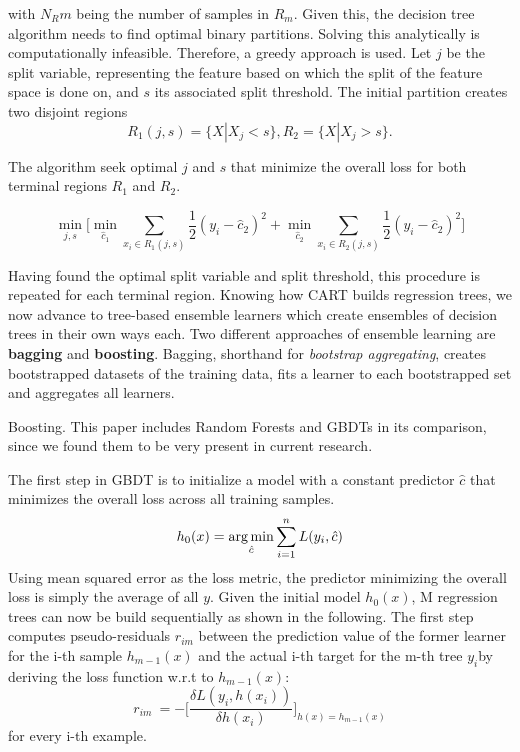 with $ N_Rm $ being the number of samples in $ R_m $. Given this, the decision tree algorithm needs to find optimal binary partitions. Solving this analytically is computationally infeasible. Therefore, a greedy approach is used.
Let $ j $ be the split variable, representing the feature based on which the split of the feature space is done on, and $ s $ its associated split threshold.
The initial partition creates two disjoint regions
\begin{equation}
	R_1 (j,s) = \{X | X_j < s \}, R_{2} = \{X | X_j > s\}.
\end{equation}

The algorithm seek optimal $ j $ and $ s $ that minimize the overall loss for both terminal regions $ R_1 $ and $ R_2 $.

\begin{equation}\label{minjs}
	\min_{j,s} \bigg [\min_{\hat{c}_1} \sum_{x_i \in R_1(j,s)} \dfrac{1}{2}(y_i - \hat{c}_{2})^2 + \min_{\hat{c}_2} \sum_{x_i \in R_{2}(j,s)} \dfrac{1}{2}(y_i - \hat{c}_{2})^2\bigg]
\end{equation}

Having found the optimal split variable and split threshold, this procedure is repeated for each terminal region.
Knowing how CART builds regression trees, we now advance to tree-based ensemble learners which create ensembles of decision trees in their own ways each.
Two different approaches of ensemble learning are \textbf{bagging} and \textbf{boosting}. Bagging, shorthand for \textit{bootstrap aggregating}, creates bootstrapped datasets of the training data, fits a learner to each bootstrapped set and aggregates all learners.


Boosting. 
This paper includes Random Forests and GBDTs in its comparison, since we found them to be very present in current research.  



The first step in GBDT is to initialize a model with a constant predictor $ \hat{c} $ that minimizes the overall loss across all training samples.
\begin{equation}
h_{0}(x) =  \operatorname*{arg\,min}_{\hat{c}} \sum_{i=1}^n L(y_i,\hat{c}) \label{gbdt_step1}
\end{equation}
Using mean squared error as the loss metric, the predictor minimizing the overall loss is simply the average of all $ y $.
Given the initial model $ h_0(x) $, M regression trees can now be build sequentially as shown in the following. 
The first step computes pseudo-residuals $ r_{im} $ between the prediction value of the former learner for the i-th sample $ h_{m-1}(x) $ and the actual i-th target for the m-th tree $ y_i $by deriving the loss function w.r.t to $ h_{m-1}(x) $: 
\begin{equation}
	r_{im}\ = - \bigg[\dfrac{\delta L(y_i, h(x_i))}{\delta h(x_i)}\bigg]_{h(x) = h_{m-1}(x)}
\end{equation} 
for every i-th example.

